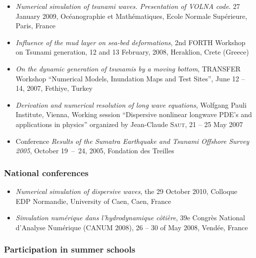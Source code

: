 \documentclass[final, a4paper, oneside, 12pt]{article}
\numberwithin{equation}{section}
\begin{document}
\begin{itemize}
  \item \textit{Numerical simulation of tsunami waves. Presentation of VOLNA code}. 27 January 2009, Oc\'eanographie et Math\'ematiques, Ecole Normale Sup\'erieure, Paris, France
  
  \item \textit{Influence of the mud layer on sea-bed deformations}, 2nd FORTH Workshop on Tsunami generation, 12 and 13 February, 2008, Heraklion, Crete (Greece)
  
  \item \textit{On the dynamic generation of tsunamis by a moving bottom}, TRANSFER Workshop ``Numerical Models, Inundation Maps and Test Sites'', June 12 -- 14, 2007, Fethiye, Turkey
  
  \item \textit{Derivation and numerical resolution of long wave equations}, Wolfgang Pauli Institute, Vienna, Working session ``Dispersive nonlinear longwave PDE's and applications in physics'' organized by Jean-Claude \textsc{Saut}, 21 -- 25 May 2007

  \item Conference \og \textit{Results of the Sumatra Earthquake and Tsunami Offshore Survey 2005}\fg{}, October 19~--~24, 2005, Fondation des Treilles
\end{itemize}

\subsubsection{National conferences}

\begin{itemize}

  \item \textit{Numerical simulation of dispersive waves}, the 29 October 2010, Colloque EDP Normandie, University of Caen, Caen, France
  
  \item \textit{Simulation num\'erique dans l'hydrodynamique c\^oti\`ere}, 39e Congr\`es National d'Analyse Num\'erique (CANUM 2008), 26 -- 30 of May 2008, Vend\'ee, France
  
\end{itemize}

\subsubsection{Participation in summer schools}
\end{document}
